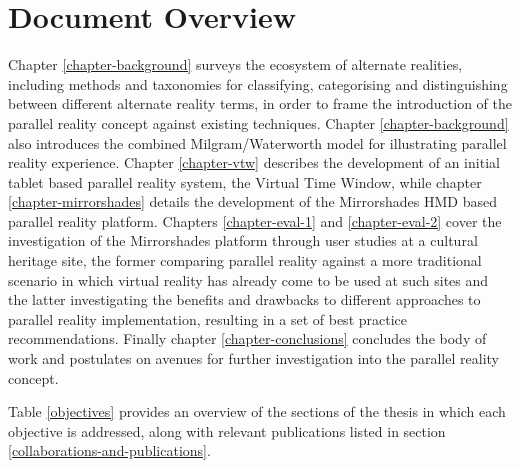 
\section{Document Overview}

Chapter \ref{chapter-background} surveys the ecosystem of alternate realities, including methods and taxonomies for classifying, categorising and distinguishing between different alternate reality terms, in order to frame the introduction of the parallel reality concept against existing techniques. Chapter \ref{chapter-background} also introduces the combined Milgram/Waterworth model for illustrating parallel reality experience. Chapter \ref{chapter-vtw} describes the development of an initial tablet based parallel reality system, the Virtual Time Window, while chapter \ref{chapter-mirrorshades} details the development of the Mirrorshades HMD based parallel reality platform. Chapters \ref{chapter-eval-1} and \ref{chapter-eval-2} cover the investigation of the Mirrorshades platform through user studies at a cultural heritage site, the former comparing parallel reality against a more traditional scenario in which virtual reality has already come to be used at such sites and the latter investigating the benefits and drawbacks to different approaches to parallel reality implementation, resulting in a set of best practice recommendations. Finally chapter \ref{chapter-conclusions} concludes the body of work and postulates on avenues for further investigation into the parallel reality concept.

Table \ref{objectives} provides an overview of the sections of the thesis in which each objective is addressed, along with relevant publications listed in section \ref{collaborations-and-publications}.

\vspace{5mm}

